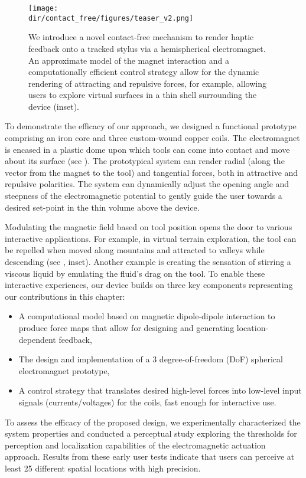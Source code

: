 \begin{figure}[t]
\centering
\texttt{[image: \\dir/contact\_free/figures/teaser\_v2.png]}
\caption{We introduce a novel contact-free mechanism to render haptic feedback onto a tracked stylus via a hemispherical electromagnet. An approximate model of the magnet interaction and a computationally efficient control strategy allow for the dynamic rendering of attracting and repulsive forces, for example, allowing users to explore virtual surfaces in a thin shell surrounding the device (inset).}
\label{fig:syst_overview}
\end{figure}

To demonstrate the efficacy of our approach, we designed a functional prototype comprising an iron core and three custom-wound copper coils. The electromagnet is encased in a plastic dome upon which tools can come into contact and move about its surface (see ). The prototypical system can render radial (along the vector from the magnet to the tool) and tangential forces, both in attractive and repulsive polarities. The system can dynamically adjust the opening angle and steepness of the electromagnetic potential to gently guide the user towards a desired set-point in the thin volume above the device.

Modulating the magnetic field based on tool position opens the door to various interactive applications. For example, in virtual terrain exploration, the tool can be repelled when moved along mountains and attracted to valleys while descending (see , inset). Another example is creating the sensation of stirring a viscous liquid by emulating the fluid's drag on the tool. To enable these interactive experiences, our device builds on three key components representing our contributions in this chapter:
\begin{itemize}
\item A computational model based on magnetic dipole-dipole interaction to produce force maps that allow for designing and generating location-dependent feedback,
\item The design and implementation of a 3 degree-of-freedom (DoF) spherical electromagnet prototype,
\item A control strategy that translates desired high-level forces into low-level input signals (currents/voltages) for the coils, fast enough for interactive use.
\end{itemize}
To assess the efficacy of the proposed design, we experimentally characterized the system properties and conducted a perceptual study exploring the thresholds for perception and localization capabilities of the electromagnetic actuation approach. Results from these early user tests indicate that users can perceive at least 25 different spatial locations with high precision.